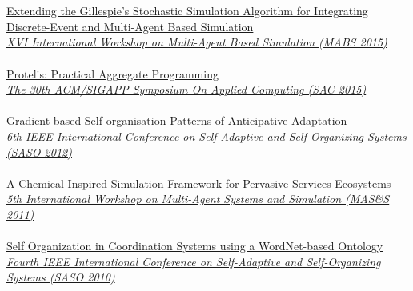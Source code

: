 \documentclass[10pt]{article}
\newcommand{\halfblankline}{\quad\vspace{-0.5\baselineskip}\pagebreak[3]}
\begin{document}
\\ \halfblankline \\
\href{https://www.slideshare.net/DanySK/extending-the-gillespies-stochastic-simulation-algorithm-for-integrating-discreteevent-and-multiagent-based-simulation}{Extending the Gillespie's Stochastic Simulation Algorithm for Integrating Discrete-Event and Multi-Agent Based Simulation} \\
\href{http://www.springer.com/gp/book/9783319314464}{\textit{XVI International Workshop on Multi-Agent Based Simulation (MABS 2015)}}
\\ \halfblankline \\
\href{https://www.slideshare.net/DanySK/sac-47194849}{Protelis: Practical Aggregate Programming} \\
\href{https://www.sigapp.org/sac/sac2015/}{\textit{The 30th ACM/SIGAPP Symposium On Applied Computing (SAC 2015)}}
\\ \halfblankline \\
\href{https://www.slideshare.net/DanySK/gradientbased-selforganisation-patterns-of-anticipative-adaptation}{Gradient-based Self-organisation Patterns of Anticipative Adaptation} \\
\href{http://saso2012.univ-lyon1.fr/}{\textit{6th IEEE International Conference on Self-Adaptive and Self-Organizing Systems (SASO 2012)}}
\\ \halfblankline \\
\href{http://apice.unibo.it/xwiki/bin/view/Talks/PianiniMass2011}{A Chemical Inspired Simulation Framework for Pervasive Services Ecosystems} \\
\href{https://fedcsis.org/2011/}{\textit{5th International Workshop on Multi-Agent Systems and Simulation (MAS\&S 2011)}}
\\ \halfblankline \\
\href{http://apice.unibo.it/xwiki/bin/view/Talks/PianiniVirrusoSASO10}{Self Organization in Coordination Systems using a WordNet-based Ontology} \\
\href{http://www.inf.u-szeged.hu/projectdirs/saso10/}{\textit{Fourth IEEE International Conference on Self-Adaptive and Self-Organizing Systems (SASO 2010)}}
\end{document}
